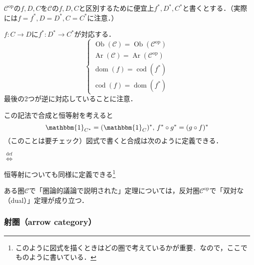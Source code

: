 \documentclass[dvipdfmx,a4j,10pt]{jsarticle}
\theoremstyle{mystyle1}
\theoremstyle{mystyle2}
\newcommand{\defLeftrightarrow}{\overset{\text{def}}{\iff}}
\DeclareMathOperator{\Ob}{Ob}
\DeclareMathOperator{\Ar}{Ar}
\DeclareMathOperator{\dom}{dom}
\DeclareMathOperator{\cod}{cod}
\begin{document}
$\mathcal{C}^{\mathrm{op}}$の$f,D,C$を$\mathcal{C}$の$f,D,C$と区別するために便宜上$f^*,D^*,C^*$と書くとする．（実際には$f=f^*,D=D^*,C=C^*$に注意．）

$f:C\to D$に$f^*:D^* \to C^*$が対応する．
	\[
		\begin{cases}
			\Ob(\mathcal{C})  =\Ob(\mathcal{C}^{\mathrm{op}}) \\
			\Ar(\mathcal{C})  =\Ar(\mathcal{C}^{\mathrm{op}}) \\
			\dom(f)           =\cod(f^*)                      \\
			\cod(f)           =\dom(f^*)
		\end{cases}
	\]
	最後の2つが逆に対応していることに注意．

	この記法で合成と恒等射を考えると
	\[
		\mathbbm{1}_{C^*}=(\mathbbm{1}_C)^*,\, f^*\circ g^*=(g\circ f)^*
	\]
	（このことは要チェック）図式で書くと合成は次のように定義できる．
	\begin{center}
		$\defLeftrightarrow$
	\end{center}
	恒等射についても同様に定義できる\footnote{このように図式を描くときはどの圏で考えているかが重要．なので，ここでものように書いている．}

	ある圏$\mathcal{C}$で「圏論的議論で説明された」定理については，反対圏$\mathcal{C}^{\mathrm{op}}$で「双対な（dual）」定理が成り立つ．

	\subsubsection{射圏（arrow category）}
\end{document}
